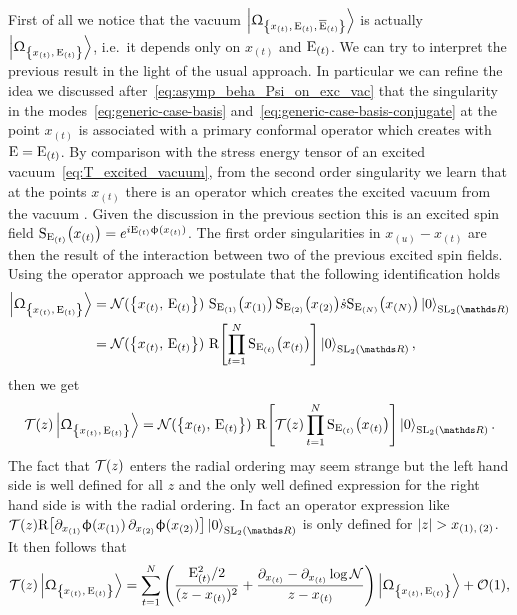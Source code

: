 First of all we notice that the vacuum $\Gexcvacket$ is actually $\GGexcvacket$, i.e.\ it depends only on $x_{(t)}$ and $\mathrm{E}_{(t)}$.
We can try to interpret the previous result in the light of the usual \cft approach.
In particular we can refine the idea we discussed after~\eqref{eq:asymp_beha_Psi_on_exc_vac} that the singularity in the modes~\eqref{eq:generic-case-basis} and~\eqref{eq:generic-case-basis-conjugate} at the point $x_{(t)}$ is associated with a primary conformal operator which creates \eexcvacket with $\mathrm{E} = \mathrm{E}_{(t)}$.
By comparison with the stress energy tensor of an excited vacuum~\eqref{eq:T_excited_vacuum}, from the second order singularity we learn that at the points $x_{(t)}$ there is an operator which creates the excited vacuum \GGexcvacket from the  vacuum \regvacuum.
Given the discussion in the previous section this is an excited spin field $\mathrm{S}_{\mathrm{E}_{(t)}}\qty( x_{(t)}) = e^{i \mathrm{E}_{(t)} \upphi( x_{(t)} )}$.
The first order singularities in $x_{(u)} - x_{(t)}$ are then the result of the interaction between two of the previous excited spin fields.
Using the \cft operator approach we postulate that the following identification holds
\begin{equation}
  \begin{split}
    \GGexcvacket
    & =
    \cN(\qty{x_{(t)},\, \rE_{(t)}})~
    \rS_{\rE_{(1)}}\qty( x_{(1)} )\,
    \rS_{\rE_{(2)}}\qty( x_{(2)} )
    \dots
    \rS_{\rE_{(N)}}\qty( x_{(N)} )
    \regvacuum
    \\
    & =
    \cN(\qty{x_{(t)},\, \rE_{(t)} })~
    \rR\qty[%
      \finiteprod{t}{1}{N} \rS_{\rE_{(t)}}\qty( x_{(t) } )
    ]
    \regvacuum,
    \label{eq:vacuum_R_prod_spin_fields}
  \end{split}
\end{equation}
then we get
\begin{equation}
  \cT( z )
  \GGexcvacket
  =
  \cN(\qty{x_{(t)},\, \rE_{(t)} })~
  \rR\qty[%
    \cT( z )
    \finiteprod{t}{1}{N}
    \rS_{\rE_{(t)}}\qty( x_{(t)} )
  ]
  \regvacuum.
\end{equation}
The fact that $\mathcal{T}( z )$ enters the radial ordering may seem strange but the left hand side is well defined for all $z$ and the only well defined expression for the right hand side is with the radial ordering.
In fact an operator expression like $\cT( z ) \rR\qty[ \ipd{x_{(1)}} \phi(x_{(1)})\, \ipd{x_{(2)}} \phi(x_{(2)})] \regvacuum$ is only defined for $\abs{z} > x_{(1),\, (2)}$.
It then follows that
\begin{equation}
  \cT( z )
  \GGexcvacket
  =
  \finitesum{t}{1}{N}
  \qty(%
    \frac{\rE_{(t)}^2 / 2}{(z - x_{(t)})^2}
    +
    \frac{\ipd{x_{(t)}} - \ipd{x_{(t)}} \log\cN}{z - x_{(t)}}
  )
  \GGexcvacket
  +
  \order{1},
\end{equation}
